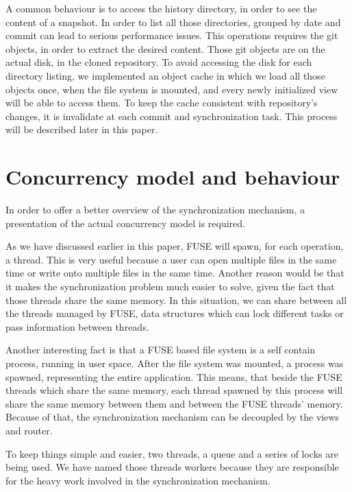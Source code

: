 A common behaviour is to access the history directory, in order to see the content of a snapshot. In order to list all those directories, grouped by date and commit can lead to serious performance issues. This operations requires the git objects, in order to extract the desired content. Those git objects are on the actual disk, in the cloned repository. To avoid accessing the disk for each directory listing, we implemented an object cache in which we load all those objects once, when the file system is mounted, and every newly initialized view will be able to access them. To keep the cache consistent with repository's changes, it is invalidate at each commit and synchronization task. This process will be described later in this paper.

\section{Concurrency model and behaviour}
In order to offer a better overview of the synchronization mechanism, a presentation of the actual concurrency model is required.

As we have discussed earlier in this paper, FUSE will spawn, for each operation, a thread. This is very useful because a user can open multiple files in the same time or write onto multiple files in the same time. Another reason would be that it makes the synchronization problem much easier to solve, given the fact that those threads share the same memory. In this situation, we can share between all the threads managed by FUSE, data structures which can lock different tasks or pass information between threads.

Another interesting fact is that a FUSE based file system is a self contain process, running in user space. After the file system was mounted, a process was spawned, representing the entire application. This means, that beside the FUSE threads which share the same memory, each thread spawned by this process will share the same memory between them and between the FUSE threads' memory. Because of that, the synchronization mechanism can be decoupled by the views and router.

To keep things simple and easier, two threads, a queue and a series of locks are being used. We have named those threads workers because they are responsible for the heavy work involved in the synchronization mechanism.

